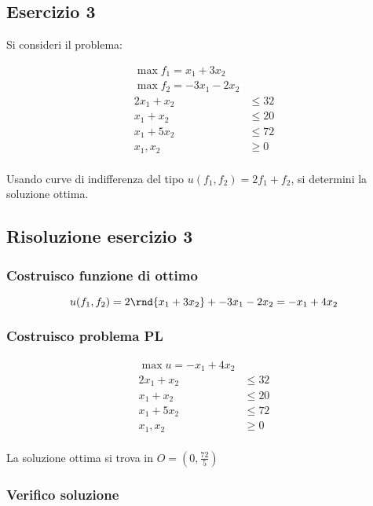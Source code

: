 \documentclass[\main/main.tex]{subfiles}
\begin{document}
\subsection{Esercizio 3}
Si consideri il problema:

\begin{align*}
  \max f_1 = x_1 + 3x_2  \\
  \max f_2 = -3x_1 -2x_2 \\
  2x_1 + x_2 & \leq 32   \\
  x_1 + x_2  & \leq 20   \\
  x_1 + 5x_2 & \leq 72   \\
  x_1, x_2   & \geq 0    \\
\end{align*}

Usando curve di indifferenza del tipo $u (f_1, f_2) = 2f_1 + f_2$, si determini la soluzione ottima.

\subsection{Risoluzione esercizio 3}

\subsubsection*{Costruisco funzione di ottimo}

\[
  u (f_1, f_2) = 2\rnd{x_1 + 3x_2} + -3x_1 - 2x_2 = -x_1 + 4x_2
\]

\subsubsection*{Costruisco problema PL}

\begin{align*}
  \max u = -x_1 + 4x_2 \\
  2x_1 + x_2 & \leq 32 \\
  x_1 + x_2  & \leq 20 \\
  x_1 + 5x_2 & \leq 72 \\
  x_1, x_2   & \geq 0  \\
\end{align*}

La soluzione ottima si trova in $O = (0, \frac{72}{5})$

\subsubsection*{Verifico soluzione}
\end{document}
